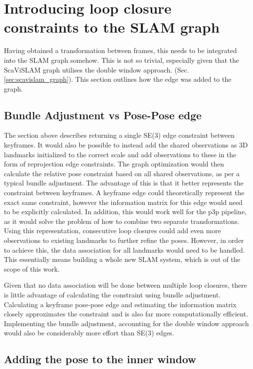 \section{Introducing loop closure constraints to the SLAM graph}

Having obtained a transformation between frames, this needs to be integrated into the SLAM graph somehow.  This is not so trivial, especially given that the ScaViSLAM graph utilises the double window approach.  (Sec. \ref{sec:scavislam_graph}).  This section outlines how the edge was added to the graph.

\subsection{Bundle Adjustment vs Pose-Pose edge}

The section above describes returning a single SE(3) edge constraint between keyframes.  It would also be possible to instead add the shared observations as 3D landmarks initialized to the correct scale and add observations to these in the form of reprojection edge constraints.  The graph optimization would then calculate the relative pose constraint based on all shared observations, as per a typical bundle adjustment.  The advantage of this is that it better represents the constraint between keyframes.  A keyframe edge could theoretically represent the exact same constraint, however the information matrix for this edge would need to be explicitly calculated.  In addition, this would work well for the p3p pipeline, as it would solve the problem of how to combine two separate transformations.  Using this representation, consecutive loop closures could add even more observations to existing landmarks to further refine the poses.  However, in order to achieve this, the data association for all landmarks would need to be handled.  This essentially means building a whole new SLAM system, which is out of the scope of this work.

Given that no data association will be done between multiple loop closures, there is little advantage of calculating the constraint using bundle adjustment.  Calculating a keyframe pose-pose edge and estimating the information matrix closely approximates the constraint and is also far more computationally efficient.  Implementing the bundle adjustment, accounting for the double window approach would also be considerably more effort than SE(3) edges.

\subsection{Adding the pose to the inner window}

